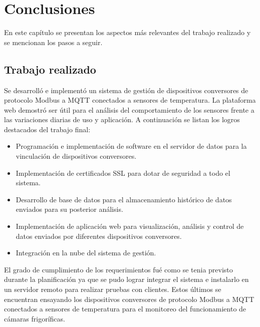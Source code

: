 
\chapter{Conclusiones} %

\label{Chapter5} %

En este capítulo se presentan los aspectos más relevantes del trabajo realizado y
se mencionan los pasos a seguir.



\section{Trabajo realizado}

Se desarrolló e implementó un sistema de gestión de dispositivos conversores de protocolo Modbus a MQTT conectados a sensores de temperatura. La plataforma web demostró ser útil para el análisis del comportamiento de los sensores frente a las variaciones diarias de uso y aplicación.  A continuación se listan los logros destacados del trabajo final:

\begin{itemize}
	\item Programación e implementación de software en el servidor de datos para la vinculación de dispositivos conversores.
	\item Implementación de certificados SSL para dotar de seguridad a todo el sistema.
	\item Desarrollo de base de datos para el almacenamiento histórico de datos enviados para su posterior análisis. 
	\item Implementación de aplicación web para visualización, análisis y control de datos enviados por diferentes dispositivos conversores.
	\item Integración en la nube del sistema de gestión. 
\end{itemize}

El grado de cumplimiento de los requerimientos fué como se tenia previsto durante la planificación ya que se pudo lograr integrar el sistema e instalarlo en un servidor remoto para realizar pruebas con clientes. Estos últimos se encuentran ensayando los dispositivos conversores de protocolo Modbus a MQTT conectados a sensores de temperatura para el monitoreo del funcionamiento de cámaras frigoríficas.

